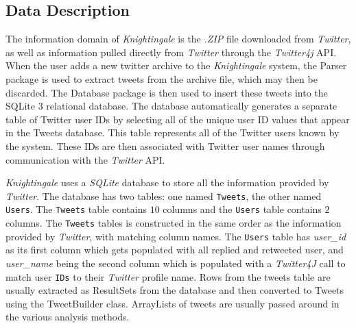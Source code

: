 \documentclass[a4paper, 12pt]{article}
\begin{document}
\subsection{Data Description} \label{sec:datadescript}
\begin{adjustwidth}{2em}{0pt}

The information domain of \textit{Knightingale} is the \textit{.ZIP} file downloaded from \textit{Twitter}, as well as information pulled directly from \textit{Twitter} through the \textit{Twitter4j} API. When the user adds a new twitter archive to the \textit{Knightingale} system, the Parser package is used to extract tweets from the archive file, which may then be discarded. The Database package is then used to insert these tweets into the SQLite 3 relational database. The database automatically generates a separate table of Twitter user IDs by selecting all of the unique user ID values that appear in the Tweets database. This table represents all of the Twitter users known by the system. These IDs are then associated with Twitter user names through communication with the \textit{Twitter} API. 

\textit{Knightingale} uses a \textit{SQLite} database to store all the information provided by \textit{Twitter}. The database has two tables: one named \texttt{Tweets}, the other named \texttt{Users}. The \texttt{Tweets} table contains $10$ columns and the \texttt{Users} table contains $2$ columns. The \texttt{Tweets} tables is constructed in the same order as the information provided by \textit{Twitter}, with matching column names. The \texttt{Users} table has \textit{user\_id} as its first column which gets populated with all replied and retweeted user, and \textit{user\_name} being the second column which is populated with a \textit{Twitter4J} call to match user \texttt{IDs} to their \textit{Twitter} profile name. Rows from the tweets table are usually extracted as ResultSets from the database and then converted to Tweets using the TweetBuilder class. ArrayLists of tweets are usually passed around in the various analysis methods.


\end{adjustwidth}
\end{document}
